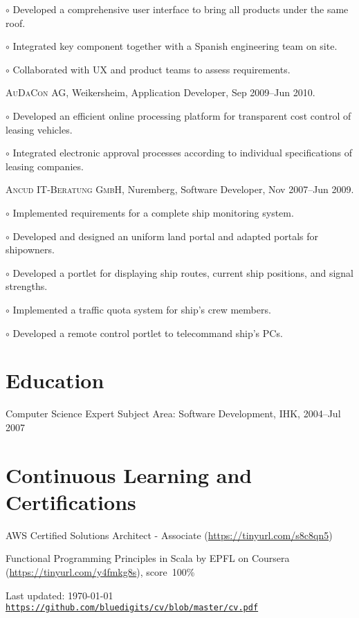\documentclass[letterpaper]{article}
\def\footerlink{https://github.com/bluedigits/cv/blob/master/cv.pdf}
\renewenvironment{itemize}{
  \begin{list}{}{
    \setlength{\leftmargin}{1.5em}
  }
}{
  \end{list}
}
\newenvironment{no-indent-itemize}{
  \begin{list}{}{
    \setlength{\leftmargin}{0em}
  }
}{
  \end{list}
}
\def\bullet{$\circ$\xspace}
\begin{document}
\begin{no-indent-itemize}
\begin{itemize}
	\item\bullet Developed a comprehensive user interface to bring all products under the same roof.
	\item\bullet Integrated key component together with a Spanish engineering team on site.
    \item\bullet Collaborated with UX and product teams to assess requirements.
  \end{itemize}
    \item \textsc{AuDaCon AG}, Weikersheim, Application Developer, Sep 2009--Jun 2010.
  \begin{itemize}
    \item\bullet Developed an efficient online processing platform for transparent cost control of leasing vehicles.
    \item\bullet Integrated electronic approval processes according to individual specifications of leasing companies.
  \end{itemize}
    \item \textsc{Ancud IT-Beratung GmbH}, Nuremberg, Software Developer, Nov 2007--Jun 2009.
  \begin{itemize}
    \item\bullet Implemented requirements for a complete ship monitoring system.
    \item\bullet Developed and designed an uniform land portal and adapted portals for shipowners.
    \item\bullet Developed a portlet for displaying ship routes, current ship positions, and signal strengths.
    \item\bullet Implemented a traffic quota system for ship's crew members.
    \item\bullet Developed a remote control portlet to telecommand ship's PCs.
  \end{itemize}
\end{no-indent-itemize}

\section*{Education}
\begin{no-indent-itemize}
  \item Computer Science Expert Subject Area: Software Development, IHK, 2004--Jul 2007
\end{no-indent-itemize}

\section*{Continuous Learning and Certifications}
\begin{no-indent-itemize}
  \item AWS Certified Solutions Architect - Associate
  		(\href{https://tinyurl.com/s8c8qn5}{https://tinyurl.com/s8c8qn5})
  \item Functional Programming Principles in Scala by EPFL on Coursera
        (\href{https://tinyurl.com/y4fmkg8s}{https://tinyurl.com/y4fmkg8s}), score~100\%
\end{no-indent-itemize}

\bigskip
\begin{center}
  \begin{footnotesize}
    Last updated: \today \\
    \href{\footerlink}{\texttt{\footerlink}}
  \end{footnotesize}
\end{center}
\end{document}
